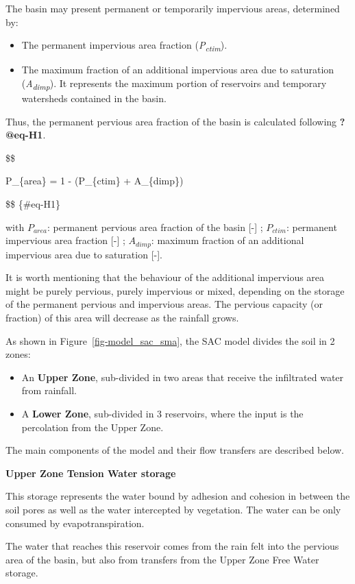 \documentclass[
  letterpaper,
  DIV=11,
  numbers=noendperiod]{scrreprt}
\begin{document}
The basin may present permanent or temporarily impervious areas,
determined by:

\begin{itemize}
\item
  The permanent impervious area fraction (\emph{P\textsubscript{ctim}}).
\item
  The maximum fraction of an additional impervious area due to
  saturation (\emph{A\textsubscript{dimp}}). It represents the maximum
  portion of reservoirs and temporary watersheds contained in the basin.
\end{itemize}

Thus, the permanent pervious area fraction of the basin is calculated
following \textbf{?@eq-H1}.

\$\$

P\_\{area\} = 1 - (P\_\{ctim\} + A\_\{dimp\})

\$\$ \{\#eq-H1\}

with \(P_{area}\): permanent pervious area fraction of the basin {[}-{]}
; \(P_{ctim}\): permanent impervious area fraction {[}-{]} ;
\(A_{dimp}\): maximum fraction of an additional impervious area due to
saturation {[}-{]}.

It is worth mentioning that the behaviour of the additional impervious
area might be purely pervious, purely impervious or mixed, depending on
the storage of the permanent pervious and impervious areas. The pervious
capacity (or fraction) of this area will decrease as the rainfall grows.

As shown in Figure~\ref{fig-model_sac_sma}, the SAC model divides the
soil in 2 zones:

\begin{itemize}
\item
  An \textbf{Upper Zone}, sub-divided in two areas that receive the
  infiltrated water from rainfall.
\item
  A \textbf{Lower Zone}, sub-divided in 3 reservoirs, where the input is
  the percolation from the Upper Zone.
\end{itemize}

The main components of the model and their flow transfers are described
below.

\textbf{Upper Zone Tension Water storage}

This storage represents the water bound by adhesion and cohesion in
between the soil pores as well as the water intercepted by vegetation.
The water can be only consumed by evapotranspiration.

The water that reaches this reservoir comes from the rain felt into the
pervious area of the basin, but also from transfers from the Upper Zone
Free Water storage.
\end{document}
